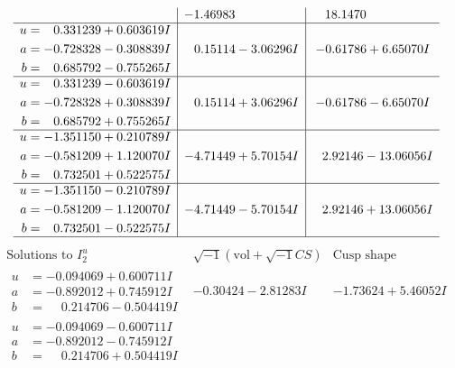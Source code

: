 \documentclass[1p]{elsarticle_modified}
\theoremstyle{definition}
\newcommand{\I}{\sqrt{-1}}
\begin{document}
$$\begin{array}{c|c|c}
 & -1.46983\phantom{ +0.000000I} & \phantom{-}18.1470\phantom{ +0.000000I} \\ \hline\begin{aligned}
u &= \phantom{-}0.331239 + 0.603619 I \\
a &= -0.728328 - 0.308839 I \\
b &= \phantom{-}0.685792 - 0.755265 I\end{aligned}
 & \phantom{-}0.15114 - 3.06296 I & -0.61786 + 6.65070 I \\ \hline\begin{aligned}
u &= \phantom{-}0.331239 - 0.603619 I \\
a &= -0.728328 + 0.308839 I \\
b &= \phantom{-}0.685792 + 0.755265 I\end{aligned}
 & \phantom{-}0.15114 + 3.06296 I & -0.61786 - 6.65070 I \\ \hline\begin{aligned}
u &= -1.351150 + 0.210789 I \\
a &= -0.581209 + 1.120070 I \\
b &= \phantom{-}0.732501 + 0.522575 I\end{aligned}
 & -4.71449 + 5.70154 I & \phantom{-}2.92146 - 13.06056 I \\ \hline\begin{aligned}
u &= -1.351150 - 0.210789 I \\
a &= -0.581209 - 1.120070 I \\
b &= \phantom{-}0.732501 - 0.522575 I\end{aligned}
 & -4.71449 - 5.70154 I & \phantom{-}2.92146 + 13.06056 I\\
 \hline 
 \end{array}$$\newpage$$\begin{array}{c|c|c}  
\text{Solutions to }I^u_{2}& \I (\text{vol} + \sqrt{-1}CS) & \text{Cusp shape}\\
 \hline 
\begin{aligned}
u &= -0.094069 + 0.600711 I \\
a &= -0.892012 + 0.745912 I \\
b &= \phantom{-}0.214706 - 0.504419 I\end{aligned}
 & -0.30424 - 2.81283 I & -1.73624 + 5.46052 I \\ \hline\begin{aligned}
u &= -0.094069 - 0.600711 I \\
a &= -0.892012 - 0.745912 I \\
b &= \phantom{-}0.214706 + 0.504419 I\end{aligned}

\end{array}$$
\end{document}

